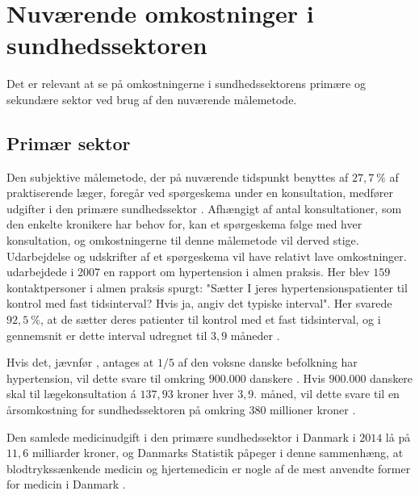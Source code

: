\section{Nuværende omkostninger i sundhedssektoren}
Det er relevant at se på omkostningerne i sundhedssektorens primære og sekundære sektor ved brug af den nuværende målemetode. 

\subsection{Primær sektor} \label{sec:nuv_primaer}
\label{sec:primaer_sektor_omkostninger}
Den subjektive målemetode, der på nuværende tidspunkt benyttes af $27,7~\%$ af praktiserende læger, foregår ved spørgeskema under en konsultation, medfører udgifter i den primære sundhedssektor \citep{munck2007}. Afhængigt af antal konsultationer, som den enkelte kronikere har behov for, kan et spørgeskema følge med hver konsultation, og omkostningerne til denne målemetode vil derved stige. Udarbejdelse og udskrifter af et spørgeskema vil have relativt lave omkostninger.
\citeauthor{munck2007} udarbejdede i 2007 en rapport om hypertension i almen praksis. Her blev $159$ kontaktpersoner i almen praksis spurgt: "Sætter I jeres hypertensionspatienter til kontrol med fast tidsinterval? Hvis ja, angiv det typiske interval". Her svarede $92,5~\%$, at de sætter deres patienter til kontrol med et fast tidsinterval, og i gennemsnit er dette interval udregnet til $3,9$ måneder \citep{munck2007}. 

Hvis det, jævnfør \citeauthor{kronborg2008}, antages at $1/5$ af den voksne danske befolkning har hypertension, vil dette svare til omkring $900.000$ danskere \citep{folketal2016}. Hvis $900.000$ danskere skal til lægekonsultation á $137,93$ kroner hver $3,9$. måned, vil dette svare til en årsomkostning for sundhedssektoren på omkring $380$ millioner kroner \citep{honorartabel2016}. 

Den samlede medicinudgift i den primære sundhedssektor i Danmark i $2014$ lå på $11,6$ milliarder kroner, og Danmarks Statistik påpeger i denne sammenhæng, at blodtrykssænkende medicin og hjertemedicin er nogle af de mest anvendte former for medicin i Danmark \citep{dst2016}. 

